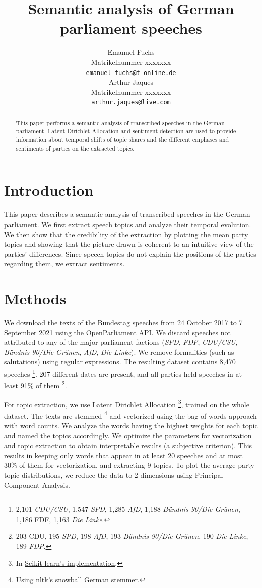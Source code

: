 \documentclass{article}
\title{Semantic analysis of German parliament speeches}
\author{%
  Emanuel Fuchs\\
  Matrikelnummer xxxxxxx\\
  \texttt{emanuel-fuchs@t-online.de} \\
  \And
  Arthur Jaques\\
  Matrikelnummer xxxxxxx\\
  \texttt{arthur.jaques@live.com} \\
}
\begin{document}
\maketitle


\begin{abstract}
  This paper performs a semantic analysis of transcribed speeches in the German parliament.
  Latent Dirichlet Allocation and sentiment detection are used to provide information about temporal shifts of topic shares and the different emphases and sentiments of parties on the extracted topics. 
\end{abstract}


\section{Introduction}
This paper describes a semantic analysis of transcribed speeches in the German parliament. 
We first extract speech topics and analyze their temporal evolution.
We then show that the credibility of the extraction by plotting the mean party topics and showing that the picture drawn is coherent to an intuitive view of the parties' differences.
Since speech topics do not explain the positions of the parties regarding them, we extract sentiments.


\section{Methods}
We download the texts of the Bundestag speeches from 24 October 2017 to 7 September 2021 using the OpenParliament \cite{OpenParliamentTV} API.
We discard speeches not attributed to any of the major parliament factions (\textit{SPD}, \textit{FDP}, \textit{CDU/CSU}, \textit{Bündnis 90/Die Grünen}, \textit{AfD}, \textit{Die Linke}).
We remove formalities (such as salutations) using regular expressions.
The resulting dataset contains 8,470 speeches
\footnote{2,101 \textit{CDU/CSU}, 1,547 \textit{SPD}, 1,285 \textit{AfD}, 1,188 \textit{Bündnis 90/Die Grünen}, 1,186 FDF, 1,163 \textit{Die Linke}.}.
207 different dates are present, and all parties held speeches in at least 91\% of them
\footnote{203 CDU, 195 \textit{SPD}, 198 \textit{AfD}, 193 \textit{Bündnis 90/Die Grünen}, 190 \textit{Die Linke}, 189 \textit{FDP}.}.

For topic extraction, we use Latent Dirichlet Allocation
\footnote{In \href{https://scikit-learn.org/stable/modules/generated/sklearn.decomposition.LatentDirichletAllocation.html}{Scikit-learn's implementation}.},
trained on the whole dataset.
The texts are stemmed
\footnote{Using \href{https://www.nltk.org/_modules/nltk/stem/snowball.html}{nltk's snowball German stemmer}.}
and vectorized using the bag-of-words approach with word counts.
We analyze the words having the highest weights for each topic and named the topics accordingly.
We optimize the parameters for vectorization and topic extraction to obtain interpretable results (a subjective criterion).
This results in keeping only words that appear in at least 20 speeches and at most 30\% of them for vectorization, and extracting 9 topics.
To plot the average party topic distributions, we reduce the data to 2 dimensions using Principal Component Analysis.
\end{document}
